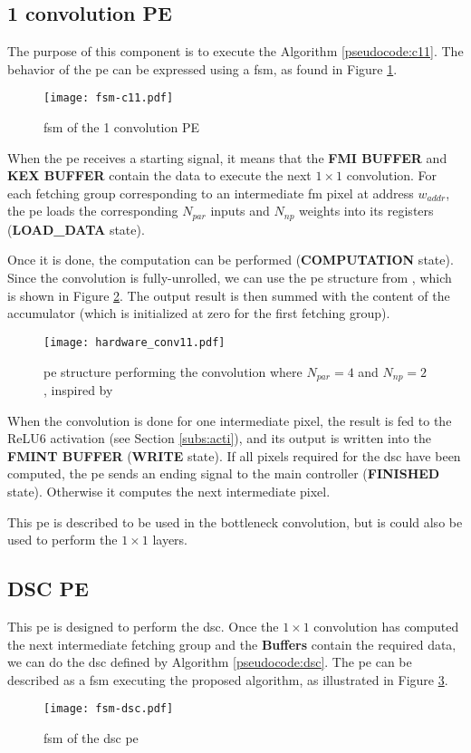\subsection{1 convolution PE}
%
The purpose of this component is to execute the Algorithm \ref{pseudocode:c11}. The behavior of the \acrshort{pe} can be expressed using a \acrshort{fsm}, as found in Figure \ref{fig:fsm_c11}.
%
\begin{figure}[H]
    \centering
    \texttt{[image: fsm-c11.pdf]}
    \caption{\acrshort{fsm} of the 1 convolution PE}
    \label{fig:fsm_c11}
\end{figure}
%
When the \acrshort{pe} receives a starting signal, it means that the \textbf{FMI BUFFER} and \textbf{KEX BUFFER} contain the data to execute the next $1 \times 1$ convolution. For each fetching group corresponding to an intermediate \acrshort{fm} pixel at address $w_{addr}$, the \acrshort{pe} loads the corresponding $N_{par}$ inputs and $N_{np}$ weights into its registers (\textbf{LOAD\_DATA} state).

Once it is done, the computation can be performed (\textbf{COMPUTATION} state). Since the convolution is fully-unrolled, we can use the \acrshort{pe} structure from \textcite{kang_accelerator-aware_2020}, which is shown in Figure \ref{fig:c11_hardware}. The output result is then summed with the content of the accumulator (which is initialized at zero for the first fetching group).
%
\begin{figure}[H]
    \centering
    \texttt{[image: hardware\_conv11.pdf]}
    \caption{\acrshort{pe} structure performing the convolution where $N_{par} = 4$ and $N_{np} = 2$, inspired by \cite{kang_accelerator-aware_2020}}
    \label{fig:c11_hardware}
\end{figure}

When the convolution is done for one intermediate pixel, the result is fed to the ReLU6 activation (see Section \ref{subs:acti}), and its output is written into the \textbf{FMINT BUFFER} (\textbf{WRITE} state). If all pixels required for the \acrshort{dsc} have been computed, the \acrshort{pe} sends an ending signal to the main controller (\textbf{FINISHED} state). Otherwise it computes the next intermediate pixel.

This \acrshort{pe} is described to be used in the bottleneck convolution, but is could also be used to perform the $1 \times 1$ layers.
%
\subsection{DSC PE}
%
This \acrshort{pe} is designed to perform the \acrshort{dsc}. Once the $1 \times 1$ convolution has computed the next intermediate fetching group and the \textbf{Buffers} contain the required data, we can do the \acrshort{dsc} defined by Algorithm \ref{pseudocode:dsc}. The \acrshort{pe} can be described as a \acrshort{fsm} executing the proposed algorithm, as illustrated in Figure \ref{fig:fsm_dsc}.
%
\begin{figure}[H]
    \centering
    \texttt{[image: fsm-dsc.pdf]}
    \caption{\acrshort{fsm} of the \acrshort{dsc} \acrshort{pe}}
    \label{fig:fsm_dsc}
\end{figure}

